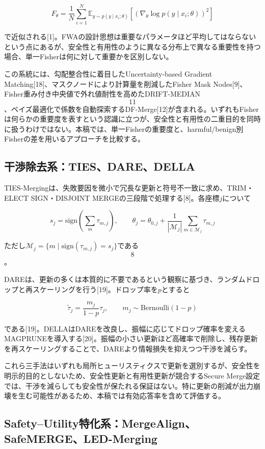 \documentclass{article}
\begin{document}
\[
\hat F_{\theta}=\frac{1}{N}\sum_{i=1}^{N}\mathbb{E}_{y\sim p(y\mid x_i;\theta)}\left[(\nabla_{\theta}\log p(y\mid x_i;\theta))^2\right]
\tag{5}
\]

で近似される[1]。FWAの設計思想は重要なパラメータほど平均してはならないという点にあるが、安全性と有用性のように異なる分布上で異なる重要性を持つ場合、単一Fisherは何に対して重要かを区別しない。

この系統には、勾配整合性に着目したUncertainty-based Gradient Matching[18]、マスクノードにより計算量を削減したFisher Mask Nodes[9]、Fisher重み付き中央値で外れ値耐性を高めたDRIFT-MEDIAN\[11\]、ベイズ最適化で係数を自動探索するDF-Merge[12]が含まれる。いずれもFisherは何らかの重要度を表すという認識に立つが、安全性と有用性の二重目的を同時に扱うわけではない。本稿では、単一Fisherの重要度と、harmful/benign別Fisherの差を用いるアプローチを比較する。

\subsection{干渉除去系：TIES、DARE、DELLA}

TIES-Mergingは、失敗要因を微小で冗長な更新と符号不一致に求め、TRIM・ELECT SIGN・DISJOINT MERGEの三段階で処理する[8]。各座標\(j\)について

\[
s_j=\mathrm{sign}\left(\sum_m \tau_{m,j}\right),\qquad
\theta_j=\theta_{0,j}+\frac{1}{|\mathcal{M}_j|}\sum_{m\in\mathcal{M}_j}\tau_{m,j}
\tag{6}
\]

ただし\(\mathcal{M}_j=\{m\mid \mathrm{sign}(\tau_{m,j})=s_j\}\)である\[8\]。

DAREは、更新の多くは本質的に不要であるという観察に基づき、ランダムドロップと再スケーリングを行う[19]。ドロップ率を\(p\)とすると

\[
\tilde{\tau}_j=\frac{m_j}{1-p}\tau_j,\qquad m_j\sim\mathrm{Bernoulli}(1-p)
\tag{7}
\]

である[19]。DELLAはDAREを改良し、振幅に応じてドロップ確率を変えるMAGPRUNEを導入する[20]。振幅の小さい更新ほど高確率で削除し、残存更新を再スケーリングすることで、DAREより情報損失を抑えつつ干渉を減らす。

これら三手法はいずれも局所ヒューリスティクスで更新を選別するが、安全性を明示的目的としないため、安全性更新と有用性更新が競合するSecure Merge設定では、干渉を減らしても安全性が保たれる保証はない。特に更新の削減が出力崩壊を生む可能性があるため、本稿では有効応答率を含めて評価する。

\subsection{Safety–Utility特化系：MergeAlign、SafeMERGE、LED-Merging}
\end{document}

